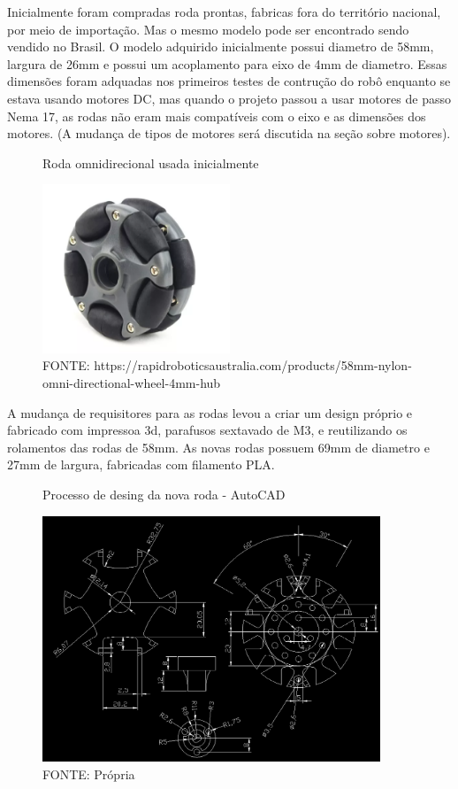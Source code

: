 Inicialmente foram compradas roda prontas, fabricas fora do território nacional, por meio de importação.
Mas o mesmo modelo pode ser encontrado sendo vendido no Brasil.
O modelo adquirido inicialmente possui diametro de 58mm, largura de 26mm e possui um acoplamento para eixo de 4mm de diametro.
Essas dimensões foram adquadas nos primeiros testes de contrução do robô enquanto se estava usando motores DC,
mas quando o projeto passou a usar motores de passo Nema 17, as rodas não eram mais compatíveis com o eixo e as dimensões dos motores.
(A mudança de tipos de motores será discutida na seção sobre motores).

\begin{figure}[h]
	\centering
	\caption{Roda omnidirecional usada inicialmente}
	\includegraphics[width=0.5\textwidth]{figures/roda_china.png}
    \caption*{FONTE: https://rapidroboticsaustralia.com/products/58mm-nylon-omni-directional-wheel-4mm-hub}
\end{figure}

A mudança de requisitores para as rodas levou a criar um design próprio e fabricado com impressoa 3d,
parafusos sextavado de M3, e reutilizando os rolamentos das rodas de 58mm.
As novas rodas possuem 69mm de diametro e 27mm de largura, fabricadas com filamento PLA.

\begin{figure}[h]
	\centering
	\caption{Processo de desing da nova roda - AutoCAD}
	\includegraphics[width=0.9\textwidth]{figures/roda_processo_desing_passo1}
    \caption*{FONTE: Própria}
\end{figure}

